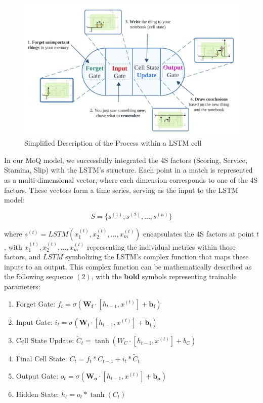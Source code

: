 \documentclass[12pt]{article}  %
\begin{document}
\begin{figure}[htbp]  %
	\centering  %
	\includegraphics[width=.8\textwidth]{LSTM.png} %
	\caption{Simplified Description of the Process within a LSTM cell \cite{12}} %
\end{figure}
\vspace{-0.2cm}

In our MoQ model, we successfully integrated the 4S factors (Scoring, Service, Stamina, Slip) with the LSTM's structure. Each point in a match is represented as a multi-dimensional vector, where each dimension corresponds to one of the 4S factors. These vectors form a time series, serving as the input to the LSTM model:

\[ S = \{s^{(1)}, s^{(2)}, ..., s^{(n)}\} \]

where \( s^{(t)} = LSTM(x_1^{(t)}, x_2^{(t)}, ..., x_m^{(t)}) \) encapsulates the 4S factors at point \( t \), with \( x_1^{(t)}, x_2^{(t)}, ..., x_m^{(t)} \) representing the individual metrics within those factors, and \( LSTM \) symbolizing the LSTM's complex function that maps these inputs to an output. This complex function can be mathematically described as the following sequence $(2)$, with the \textbf{bold} symbols representing trainable parameters: 


\begin{enumerate}
	\centering
\item Forget Gate: \( f_t = \sigma(\mathbf{W_f} \cdot [h_{t-1}, x^{(t)}] + \mathbf{b_f}) \)
\item Input Gate: \( i_t = \sigma(\mathbf{W_i} \cdot [h_{t-1}, x^{(t)}] + \mathbf{b_i}) \)
\item Cell State Update: \( \tilde{C}_t = \tanh(W_C \cdot [h_{t-1}, x^{(t)}] + b_C) \)
\item Final Cell State: \( C_t = f_t \ast C_{t-1} + i_t \ast \tilde{C}_t \)
\item Output Gate: \( o_t = \sigma(\mathbf{W_o} \cdot [h_{t-1}, x^{(t)}] + \mathbf{b_o}) \)
\item Hidden State: \( h_t = o_t \ast \tanh(C_t) \)
\end{enumerate}
	
\end{document}
